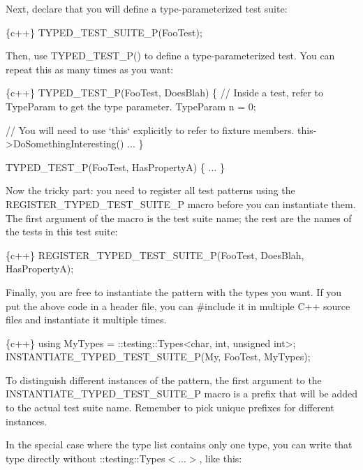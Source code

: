 Next, declare that you will define a type-\/parameterized test suite\+:


\begin{DoxyCode}
\{c++\}
TYPED\_TEST\_SUITE\_P(FooTest);
\end{DoxyCode}


Then, use {\ttfamily T\+Y\+P\+E\+D\+\_\+\+T\+E\+S\+T\+\_\+\+P()} to define a type-\/parameterized test. You can repeat this as many times as you want\+:


\begin{DoxyCode}
\{c++\}
TYPED\_TEST\_P(FooTest, DoesBlah) \{
  // Inside a test, refer to TypeParam to get the type parameter.
  TypeParam n = 0;

  // You will need to use `this` explicitly to refer to fixture members.
  this->DoSomethingInteresting()
  ...
\}

TYPED\_TEST\_P(FooTest, HasPropertyA) \{ ... \}
\end{DoxyCode}


Now the tricky part\+: you need to register all test patterns using the {\ttfamily R\+E\+G\+I\+S\+T\+E\+R\+\_\+\+T\+Y\+P\+E\+D\+\_\+\+T\+E\+S\+T\+\_\+\+S\+U\+I\+T\+E\+\_\+P} macro before you can instantiate them. The first argument of the macro is the test suite name; the rest are the names of the tests in this test suite\+:


\begin{DoxyCode}
\{c++\}
REGISTER\_TYPED\_TEST\_SUITE\_P(FooTest,
                            DoesBlah, HasPropertyA);
\end{DoxyCode}


Finally, you are free to instantiate the pattern with the types you want. If you put the above code in a header file, you can {\ttfamily \#include} it in multiple C++ source files and instantiate it multiple times.


\begin{DoxyCode}
\{c++\}
using MyTypes = ::testing::Types<char, int, unsigned int>;
INSTANTIATE\_TYPED\_TEST\_SUITE\_P(My, FooTest, MyTypes);
\end{DoxyCode}


To distinguish different instances of the pattern, the first argument to the {\ttfamily I\+N\+S\+T\+A\+N\+T\+I\+A\+T\+E\+\_\+\+T\+Y\+P\+E\+D\+\_\+\+T\+E\+S\+T\+\_\+\+S\+U\+I\+T\+E\+\_\+P} macro is a prefix that will be added to the actual test suite name. Remember to pick unique prefixes for different instances.

In the special case where the type list contains only one type, you can write that type directly without {\ttfamily \+::testing\+::\+Types$<$...$>$}, like this\+:


